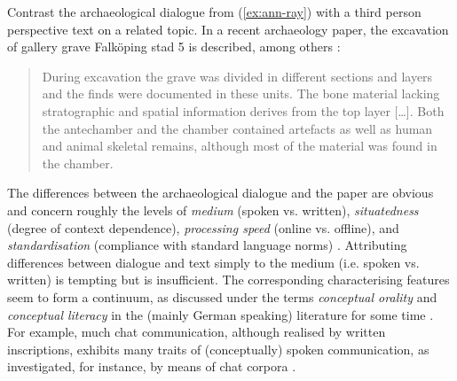 \documentclass[output=paper]{langsci/langscibook}
\begin{document}
{Contrast the archaeological dialogue from (\ref{ex:ann-ray}) with a third person perspective text on a related topic.
%
In a recent archaeology paper, the excavation of gallery grave Falk\"{o}ping stad 5 is described, among others \citep[]{Blank:Tornberg:Knipper:2018}:
%
\begin{quote}
During excavation the grave was divided in different sections and layers and the finds were documented in these units. The bone material lacking stratographic and spatial information derives from the top layer [\ldots]. Both the antechamber and the chamber contained artefacts as well as human and animal skeletal remains, although most of the material was found in the chamber.
\end{quote}


The differences between the archaeological dialogue and the paper are obvious and concern roughly the levels of \emph{medium}  (spoken vs. written), \emph{situatedness}  (degree of context dependence), \emph{processing speed}  (online vs. offline), and \emph{standardisation}  (compliance with standard language norms) \citep{Klein:1985}.
%
Attributing differences between dialogue and text simply to the medium (i.e. spoken vs. written) is tempting but is insufficient. 
%
The corresponding characterising features seem to form a continuum, as discussed under the terms \emph{conceptual orality}  and \emph{conceptual literacy}  in the (mainly German speaking) literature for some time \citep{Koch:Oesterreicher:1985}.
%
For example, much chat communication, although realised by written inscriptions, exhibits many traits of (conceptually) spoken communication, as investigated, for instance, by means of chat corpora \citep{Beisswenger:et:al:2012:a}. 
%
}
\end{document}
